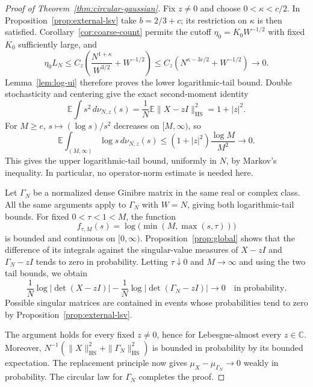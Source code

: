 \documentclass[11pt,reqno]{amsart}
\numberwithin{equation}{section}
\theoremstyle{plain}
\theoremstyle{definition}
\theoremstyle{remark}
\begin{document}
\begin{proof}[Proof of Theorem~\ref{thm:circular-gaussian}]
Fix $z\ne0$ and choose $0<\kappa<c/2$. In Proposition~\ref{prop:external-lsv}
take $b=2/3+c$; its restriction on $\kappa$ is then satisfied.
Corollary~\ref{cor:coarse-count} permits the cutoff
$\eta_0=K_0W^{-1/2}$ with fixed $K_0$ sufficiently large, and
\begin{equation}\label{eq:two-thirds-final}
 \eta_0L_N
 \leq C_z\left(\frac{N^{1+\kappa}}{W^{3/2}}+W^{-1/2}\right)
 \leq C_z\left(N^{\kappa-3c/2}+W^{-1/2}\right)\longrightarrow0.
\end{equation}
Lemma~\ref{lem:log-ui} therefore proves the lower logarithmic-tail bound.
Double stochasticity and centering give the exact second-moment identity
\begin{equation}\label{eq:second-moment-tail}
 \mathbb E\int s^2\,d\nu_{N,z}(s)
 =\frac1N\mathbb E\|X-zI\|_{\mathrm{HS}}^2=1+|z|^2.
\end{equation}
For $M\geq e$, $s\mapsto(\log s)/s^2$ decreases on $[M,\infty)$, so
\[
 \mathbb E\int_{(M,\infty)}\log s\,d\nu_{N,z}(s)
 \leq (1+|z|^2)\frac{\log M}{M^2}\longrightarrow0.
\]
This gives the upper logarithmic-tail bound, uniformly in $N$, by Markov's
inequality. In particular, no operator-norm estimate is needed here.

Let $\Gamma_N$ be a normalized dense Ginibre matrix in the same real or
complex class. All the same arguments apply to $\Gamma_N$ with $W=N$,
giving both logarithmic-tail bounds. For fixed $0<\tau<1<M$, the function
\[
 f_{\tau,M}(s)=\log\bigl(\min(M,\max(s,\tau))\bigr)
\]
is bounded and continuous on $[0,\infty)$. Proposition~\ref{prop:global}
shows that the difference of its integrals against the singular-value
measures of $X-zI$ and $\Gamma_N-zI$ tends to zero in probability.
Letting $\tau\downarrow0$ and $M\to\infty$ and using the two tail bounds,
we obtain
\begin{equation}\label{eq:replacement-log}
 \frac1N\log|\det(X-zI)|
 -\frac1N\log|\det(\Gamma_N-zI)|\longrightarrow0
 \quad\text{in probability}.
\end{equation}
Possible singular matrices are contained in events whose probabilities
tend to zero by Proposition~\ref{prop:external-lsv}.

The argument holds for every fixed $z\ne0$, hence for Lebesgue-almost
every $z\in\mathbb C$. Moreover,
$N^{-1}(\|X\|_{\mathrm{HS}}^2+\|\Gamma_N\|_{\mathrm{HS}}^2)$ is bounded
in probability by its bounded expectation. The replacement principle
\cite[Theorem~2.1]{WOS:000281425000010} now gives
$\mu_X-\mu_{\Gamma_N}\to0$ weakly in probability. The circular law for
$\Gamma_N$ completes the proof.
\end{proof}
\end{document}
